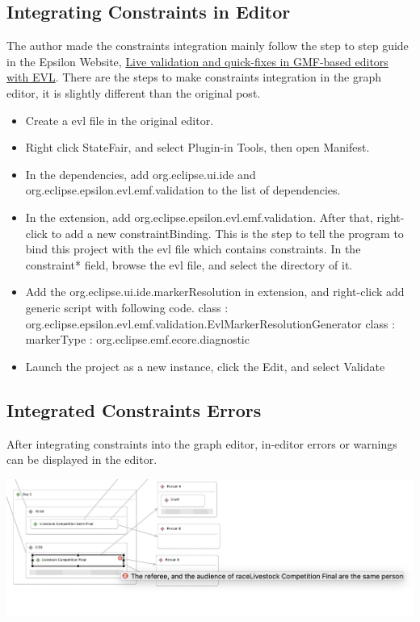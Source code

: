 \documentclass[12pt]{article}
\begin{document}
\subsection{Integrating Constraints in Editor}
The author made the constraints integration mainly follow the step to step guide in the Epsilon Website, 
\href{https://www.eclipse.org/epsilon/doc/articles/evl-gmf-integration/}{Live validation and quick-fixes in GMF-based editors with EVL}.
There are the steps to make constraints integration in the graph editor, it is slightly different than the original post.
\begin{itemize}
    \item Create a evl file in the original editor.
    \item Right click StateFair, and select Plugin-in Tools, then open Manifest.
    \item In the dependencies, add org.eclipse.ui.ide and org.eclipse.epsilon.evl.emf.validation to the list of dependencies.
    \item In the extension, add org.eclipse.epsilon.evl.emf.validation. After that, right-click to add a new constraintBinding. 
    This is the step to tell the program to bind this project with the evl file which contains constraints. In the constraint* 
    field, browse the evl file, and select the directory of it. 
    \item Add the org.eclipse.ui.ide.markerResolution in extension, and right-click add generic script with following code.
    \newline class : org.eclipse.epsilon.evl.emf.validation.EvlMarkerResolutionGenerator
    \newline class : markerType : org.eclipse.emf.ecore.diagnostic
    \item Launch the project as a new instance, click the Edit, and select Validate 
\end{itemize}

\subsection{Integrated Constraints Errors}
After integrating constraints into the graph editor, in-editor errors or warnings can be displayed in the editor.

\includegraphics[scale = 0.6]{img/graph-editor-error1}
\end{document}
